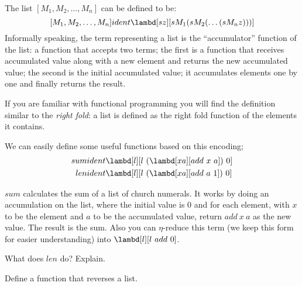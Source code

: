 \documentclass[../../../include/open-logic-section]{subfiles}
\begin{document}

The list $[M_1, M_2, \ldots, M_n]$ can be defined to be:
\[
  [M_1, M_2, \ldots, M_n] ident \lambd[sz][s M_1 (s M_2 (\ldots (s M_n z)))]
\]
Informally speaking, the term representing a list is the
``accumulator'' function of the list: a function that accepts two
terms; the first is a function that receives accumulated value along
with a new element and returns the new accumulated value; the second
is the initial accumulated value; it accumulates elements one by one
and finally returns the result.

\begin{digress}
  If you are familiar with functional programming you will find the
  definition similar to the \emph{right fold}: a list is defined as
  the right fold function of the elements it contains.
\end{digress}

We can easily define some useful functions based on this encoding; 
\begin{align*}
  {sum} &ident \lambd[l][l ~ (\lambd[xa][add ~ x ~ a])~  0]\\
  len &ident \lambd[l][l ~ (\lambd[xa][add ~ a ~ 1]) ~ 0]
\end{align*}

$sum$ calculates the sum of a list of church numerals. It works by
doing an accumulation on the list, where the initial value is $0$ and
for each element, with $x$ to be the element and $a$ to be the
accumulated value, return $add ~ x ~ a$ as the new value. The result
is the sum. Also you can $\eta$-reduce this term (we keep this form for
easier understanding) into $\lambd[l][l ~ add ~ 0]$.

\begin{prob}
  What does $len$ do? Explain.
\end{prob}

\begin{prob}
  Define a function that reverses a list.
\end{prob}
\end{document}
